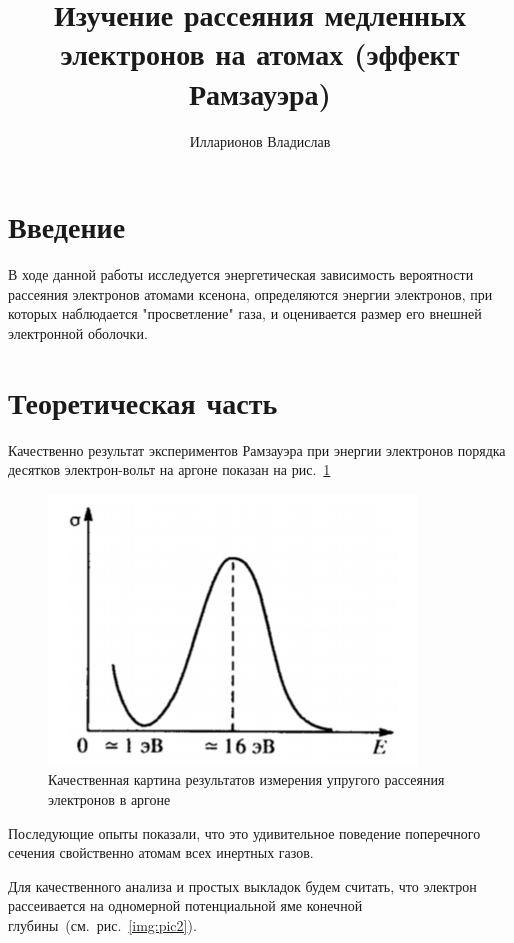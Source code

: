 \documentclass[reprint, nofootinbib, nobalancelastpage, 10pt]{revtex4-2}
\begin{document}
\title{Изучение рассеяния медленных электронов на атомах (эффект Рамзауэра)}
\author{Илларионов Владислав}

\maketitle


\section*{Введение}

В ходе данной работы исследуется энергетическая зависимость вероятности рассеяния
электронов атомами ксенона, определяются энергии электронов, при которых наблюдается
"просветление" газа, и оценивается размер его внешней электронной оболочки.


\section*{Теоретическая часть}

Качественно результат экспериментов Рамзауэра при энергии электронов порядка десятков
электрон-вольт на аргоне показан на рис.~\ref{img:pic1}

\begin{figure}[h!]
	\includegraphics[width = 0.8\linewidth]{pic_1.png}
    \caption{Качественная картина результатов измерения упругого рассеяния электронов в аргоне}
    \label{img:pic1}
\end{figure}

Последующие опыты показали, что это удивительное поведение поперечного сечения свойственно
атомам всех инертных газов.

Для качественного анализа и простых выкладок будем считать, что электрон рассеивается на
одномерной потенциальной яме конечной глубины~(см.~рис.~\ref{img:pic2}).
\end{document}
